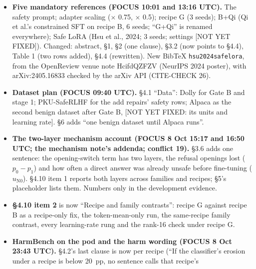\documentclass{article}
\theoremstyle{plain}
\theoremstyle{definition}
\theoremstyle{remark}
\begin{document}
\begin{itemize}
        evidence that one recipe cannot equalize the erosion, and the rule is
        disclosed as fixed after that ladder was read (\S{}4.1, \S{}6). New
        marker: [PLACEHOLDER: each family's rung]. Qwen is outside the repair
        study (\S{}4.1); its recipe-B runs enter only the same-recipe family
        contrast (\S{}4.10). The contributions, \S{}4.6 (Gate A), \S{}4.8 and
        \S{}6 say ``matched dose''.
  \item \textbf{Five mandatory references (FOCUS 10:01 and 13:16 UTC).} The
        safety prompt; adapter scaling ($\times$ 0.75, $\times$ 0.5); recipe G
        (3 seeds); B+Qi (Qi et al.'s constrained SFT on recipe B, 6 seeds;
        ``G+Qi'' is renamed everywhere); Safe LoRA (Hsu et al., 2024; 3 seeds;
        settings [NOT YET FIXED]). Changed: abstract, \S{}1, \S{}2 (one clause),
        \S{}3.2 (now points to \S{}4.4), Table 1 (two rows added), \S{}4.4
        (rewritten). New BibTeX \texttt{hsu2024safelora}, from the OpenReview
        venue note HcifdQZFZV (NeurIPS 2024 poster), with arXiv:2405.16833
        checked by the arXiv API (CITE-CHECK 26).
  \item \textbf{Dataset plan (FOCUS 09:40 UTC).} \S{}4.1 ``Data'': Dolly for
        Gate B and stage 1; PKU-SafeRLHF for the add repairs' safety rows;
        Alpaca as the second benign dataset after Gate B, [NOT YET FIXED: its
        units and learning rate]. \S{}6 adds ``one benign dataset until Alpaca
        runs''.
  \item \textbf{The two-layer mechanism account (FOCUS 8 Oct 15:17 and 16:50
        UTC; the mechanism note's addenda; conflict 19).} \S{}3.6 adds one
        sentence: the opening-switch term has two layers, the refusal openings
        lost ($p_0 - p_1$) and how often a direct answer was already unsafe
        before fine-tuning ($u_{\mathrm{N}0}$). \S{}4.10 item 1 reports both
        layers across families and recipes; \S{}5's placeholder lists them.
        Numbers only in the development evidence.
  \item \textbf{\S{}4.10 item 2} is now ``Recipe and family contrasts'': recipe
        G against recipe B as a recipe-only fix, the token-mean-only run, the
        same-recipe family contrast, every learning-rate rung and the rank-16
        check under recipe G.
  \item \textbf{HarmBench on the pod and the harm wording (FOCUS 8 Oct 23:43
        UTC).} \S{}4.2's last clause is now per recipe (``If the classifier's
        erosion under a recipe is below 20~pp, no sentence calls that recipe's

\end{itemize}
\end{document}
